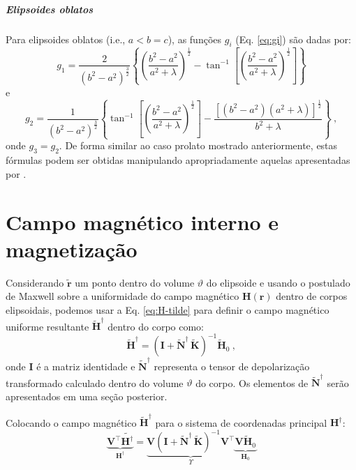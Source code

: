 \subparagraph*{Elipsoides oblatos}


Para elipsoides oblatos (i.e., $a < b = c$), as funções
$g_{i}$ (Eq. \ref{eq:gi}) são dadas por:
\begin{equation}
g_{1} =  \frac{2}{\left( b^{2} - a^{2} \right)^{\frac{3}{2}}}
\left\lbrace
\left( \frac{b^{2} - a^{2}}{a^{2} + \lambda}\right)^{\frac{1}{2}} -
\tan^{-1} \left[ \left( \frac{b^{2} - a^{2}}{a^{2} + \lambda}\right)^{\frac{1}{2}} \right]
\right\rbrace
\label{eq:g1-oblate}
\end{equation}
e
\begin{equation}
g_{2} =  \frac{1}{\left( b^{2} - a^{2} \right)^{\frac{3}{2}}}
\left\lbrace
\tan^{-1} \left[ \left( \frac{b^{2} - a^{2}}{a^{2} + \lambda}\right)^{\frac{1}{2}} \right] -
\frac{\left[ \left( b^{2} - a^{2} \right)
	\left( a^{2} + \lambda \right) \right]^{\frac{1}{2}}}
{b^{2} + \lambda}
\right\rbrace \: ,
\label{eq:g2-oblate}
\end{equation}
onde $g_{3} = g_{2}$.
De forma similar ao caso prolato mostrado anteriormente,
estas fórmulas podem ser obtidas manipulando apropriadamente aquelas
apresentadas por \citep{emerson1985}.

\section{Campo magnético interno e magnetização}

Considerando $\tilde{\mathbf{r}}$ um ponto dentro do volume $\vartheta$ do elipsoide e usando o postulado de Maxwell sobre a uniformidade do campo magnético $\mathbf{H}(\mathbf{r})$ dentro de corpos elipsoidais, podemos usar a Eq. \ref{eq:H-tilde} para definir o campo magnético uniforme resultante $\tilde{\mathbf{H}}^{\dagger}$ dentro do corpo como:
\begin{equation}
\tilde{\mathbf{H}}^{\dagger} = 
\left( \mathbf{I} + \tilde{\mathbf{N}}^{\dagger} \, \tilde{\mathbf{K}} \right)^{-1}
\tilde{\mathbf{H}}_{0} \: ,
\label{eq:Hi-tilde}
\end{equation}
onde $\mathbf{I}$ é a matriz identidade e
$\tilde{\mathbf{N}}^{\dagger}$ representa o
tensor de depolarização transformado calculado dentro do volume $\vartheta$ do corpo. Os elementos de $\tilde{\mathbf{N}}^{\dagger}$ serão apresentados em uma seção posterior.

Colocando o campo magnético $\tilde{\mathbf{H}}^{\dagger}$ para o sistema de coordenadas principal $\mathbf{H}^{\dagger}$:
\begin{equation}
\underbrace{\mathbf{V}^{\top} \tilde{\mathbf{H}^{\dagger}}}_{\mathbf{H}^{\dagger}} =  
\underbrace{\mathbf{V} \left ( \mathbf{I} + \tilde{\mathbf{N}}^{\dagger} \, \tilde{\mathbf{K}} \right)^{-1} \mathbf{V}^{\top}}_{\Upsilon}
\underbrace{\mathbf{V} \tilde{\mathbf{H}}_{0}}_{\mathbf{H}_{0}}
\label{eq:Hi}
\end{equation}

